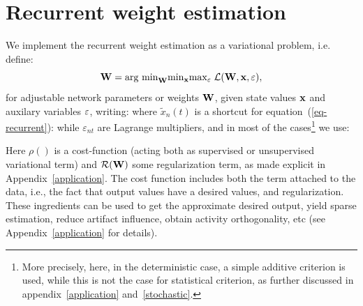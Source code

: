 \section{Recurrent weight estimation}

We implement the recurrent weight estimation as a variational problem, i.e. define: \begin{equation}\label{eq-criterion} {\bf W} = \mbox{arg min}_{{\bf W}} \mbox{min}_{\bf x} \mbox{max}_{\bf \varepsilon} \; {\cal L}({\bf W} , {\bf x}, {\bf \varepsilon}) ,\end{equation}
for adjustable network parameters or weights ${\bf W}$, given state values ${\bf x}$ and auxilary variables ${\bf \varepsilon}$, writing:
where $\tilde{x}_n(t)$ is a shortcut for equation~(\ref{eq-recurrent}):
while $\varepsilon_{nt}$ are Lagrange multipliers, and in most of the cases\footnote{More precisely, here, in the deterministic case, a simple additive criterion is used, while this is not the case for statistical criterion, as further discussed in appendix~\ref{application} and~\ref{stochastic}.} we use:

Here $\rho()$ is a cost-function (acting both as supervised or unsupervised variational term) and ${\cal R}({\bf W})$ some regularization term, as made explicit in Appendix~\ref{application}. The cost function includes both the term attached to the data, i.e., the fact that output values have a desired values, and regularization. These ingredients can be used to get the approximate desired output, yield sparse estimation, reduce artifact influence, obtain activity orthogonality, etc (see Appendix~\ref{application} for details).

